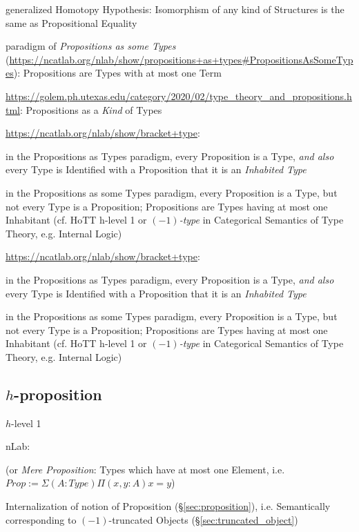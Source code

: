 {generalized Homotopy Hypothesis: Isomorphism of any kind of Structures
is the same as Propositional Equality

\asterism

paradigm of \emph{Propositions as some Types}
(\url{https://ncatlab.org/nlab/show/propositions+as+types#PropositionsAsSomeTypes}):
Propositions are Types with at most one Term

\url{https://golem.ph.utexas.edu/category/2020/02/type_theory_and_propositions.html}:
Propositions as a \emph{Kind} of Types

\url{https://ncatlab.org/nlab/show/bracket+type}:

in the Propositions as Types paradigm, every Proposition is a Type, \emph{and
  also} every Type is Identified with a Proposition that it is an
\emph{Inhabited Type}

in the Propositions as some Types paradigm, every Proposition is a Type, but
not every Type is a Proposition; Propositions are Types having at most one
Inhabitant (cf. HoTT h-level 1 or \emph{$(-1)$-type} in Categorical Semantics of
Type Theory, e.g. Internal Logic)

\url{https://ncatlab.org/nlab/show/bracket+type}:

in the Propositions as Types paradigm, every Proposition is a Type, \emph{and
  also} every Type is Identified with a Proposition that it is an
\emph{Inhabited Type}

in the Propositions as some Types paradigm, every Proposition is a Type, but
not every Type is a Proposition; Propositions are Types having at most one
Inhabitant (cf. HoTT h-level 1 or \emph{$(-1)$-type} in Categorical Semantics of
Type Theory, e.g. Internal Logic)



\subsection{$h$-proposition}\label{sec:h_proposition}

$h$-level 1

nLab:

(or \emph{Mere Proposition}: Types which have at most one Element,
i.e. $Prop := \Sigma(A : Type) \Pi(x, y : A) x = y$)

Internalization of notion of Proposition (\S\ref{sec:proposition}),
i.e. Semantically corresponding to $(-1)$-truncated Objects
(\S\ref{sec:truncated_object})

}
